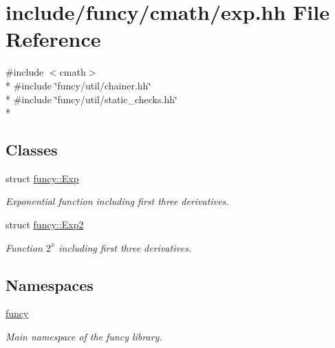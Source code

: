 \hypertarget{exp_8hh}{\section{include/funcy/cmath/exp.hh File Reference}
\label{exp_8hh}
}
{\ttfamily \#include $<$cmath$>$}\\*
{\ttfamily \#include \char`\"{}funcy/util/chainer.\-hh\char`\"{}}\\*
{\ttfamily \#include \char`\"{}funcy/util/static\-\_\-checks.\-hh\char`\"{}}\\*
\subsection*{Classes}
\begin{DoxyCompactItemize}
\item 
struct \hyperlink{structfuncy_1_1Exp}{funcy\-::\-Exp}
\begin{DoxyCompactList}\small\item\em Exponential function including first three derivatives. \end{DoxyCompactList}\item 
struct \hyperlink{structfuncy_1_1Exp2}{funcy\-::\-Exp2}
\begin{DoxyCompactList}\small\item\em Function $2^x$ including first three derivatives. \end{DoxyCompactList}\end{DoxyCompactItemize}
\subsection*{Namespaces}
\begin{DoxyCompactItemize}
\item 
\hyperlink{namespacefuncy}{funcy}
\begin{DoxyCompactList}\small\item\em Main namespace of the funcy library. \end{DoxyCompactList}\end{DoxyCompactItemize}
